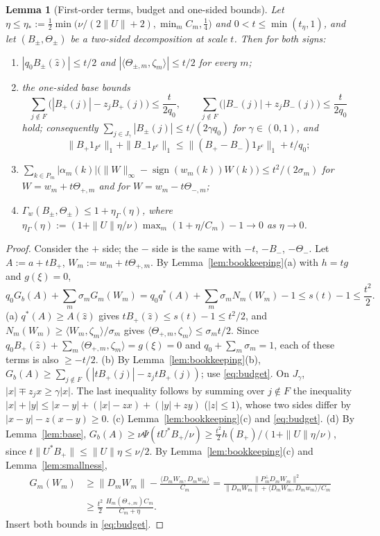 \documentclass[10pt]{amsart}
\newtheorem{lemma}[theorem]{Lemma}
\theoremstyle{definition}
\theoremstyle{remark}
\newcommand{\sgn}{\operatorname{sign}}
\newcommand{\zh}{\hat z}
\newcommand{\ip}[2]{\langle #1,#2\rangle}
\begin{document}
\begin{lemma}[First-order terms, budget and one-sided bounds]\label{lem:budget}
Let $\eta\le\eta_*:=\frac12\min\big(\nu/(2\|U\|+2),\min_mC_m,\frac14\big)$
and $0<t\le\min(t_\eta,1)$, and let $(B_\pm,\Theta_\pm)$ be a two-sided
decomposition at scale $t$.  Then for both signs:
\begin{enumerate}
\item[(a)] $|q_0B_\pm(\zh)|\le t/2$ and $|\ip{\Theta_{\pm,m}}{\zeta_m}|\le
t/2$ for every $m$;
\item[(b)] the one-sided base bounds
\[
 \sum_{j\notin F}\big(|B_+(j)|-z_jB_+(j)\big)\le\frac t{2q_0},\qquad
 \sum_{j\notin F}\big(|B_-(j)|+z_jB_-(j)\big)\le\frac t{2q_0}
\]
hold; consequently $\sum_{j\in J_\gamma}|B_\pm(j)|\le t/(2\gamma q_0)$ for
$\gamma\in(0,1)$, and
\[
 \|B_+1_{F^c}\|_1+\|B_-1_{F^c}\|_1\le\|(B_+-B_-)1_{F^c}\|_1+t/q_0;
\]
\item[(c)] $\sum_{k\in P_m}|\alpha_m(k)|\big(\|W\|_\infty-\sgn(w_m(k))W(k)
\big)\le t^2/(2\sigma_m)$ for $W=w_m+t\Theta_{+,m}$ and for
$W=w_m-t\Theta_{-,m}$;
\item[(d)] $\Gamma_w(B_\pm,\Theta_\pm)\le1+\eta_\Gamma(\eta)$, where
$\eta_\Gamma(\eta):=(1+\|U\|\eta/\nu)\max_m(1+\eta/C_m)-1\to0$ as $\eta\to0$.
\end{enumerate}
\end{lemma}

\begin{proof}
Consider the $+$ side; the $-$ side is the same with $-t$, $-B_-$,
$-\Theta_-$.  Let $A:=a+tB_+$, $W_m:=w_m+t\Theta_{+,m}$.  By
Lemma~\ref{lem:bookkeeping}(a) with $h=tg$ and $g(\xi)=0$,
\begin{equation}\label{eq:budget}
 q_0G_b(A)+\sum_m\sigma_mG_m(W_m)=q_0q^*(A)+\sum_m\sigma_mN_m(W_m)-1\le
 s(t)-1\le\frac{t^2}2 .
\end{equation}
(a) $q^*(A)\ge A(\zh)$ gives $tB_+(\zh)\le s(t)-1\le t^2/2$, and
$N_m(W_m)\ge\ip{W_m}{\zeta_m}/\sigma_m$ gives $\ip{\Theta_{+,m}}{\zeta_m}\le
\sigma_mt/2$.  Since $q_0B_+(\zh)+\sum_m\ip{\Theta_{+,m}}{\zeta_m}=g(\xi)=0$
and $q_0+\sum_m\sigma_m=1$, each of these terms is also $\ge-t/2$.
(b) By Lemma~\ref{lem:bookkeeping}(b), $G_b(A)\ge\sum_{j\notin F}(|tB_+(j)|-
z_jtB_+(j))$; use \eqref{eq:budget}.  On $J_\gamma$, $|x|\mp z_jx\ge\gamma|x|$.
The last inequality follows by summing over $j\notin F$ the inequality
$|x|+|y|\le|x-y|+(|x|-zx)+(|y|+zy)$ ($|z|\le1$), whose two sides differ by
$|x-y|-z(x-y)\ge0$.
(c) Lemma~\ref{lem:bookkeeping}(c) and \eqref{eq:budget}.
(d) By Lemma~\ref{lem:base}, $G_b(A)\ge\nu\Psi(tU^*B_+/\nu)\ge\frac{t^2}2
h(B_+)/(1+\|U\|\eta/\nu)$, since $t\|U^*B_+\|\le\|U\|\eta\le\nu/2$.  By
Lemma~\ref{lem:bookkeeping}(c) and Lemma~\ref{lem:smallness},
\begin{align*}
 G_m(W_m)&\ge\|D_mW_m\|-\frac{\ip{D_mW_m}{D_mw_m}}{C_m}=
 \frac{\|P^\perp_mD_mW_m\|^2}{\|D_mW_m\|+\ip{D_mW_m}{D_mw_m}/C_m}\\
 &\ge\frac{t^2}2\,\frac{H_m(\Theta_{+,m})C_m}{C_m+\eta}.
\end{align*}
Insert both bounds in \eqref{eq:budget}.
\end{proof}
\end{document}
